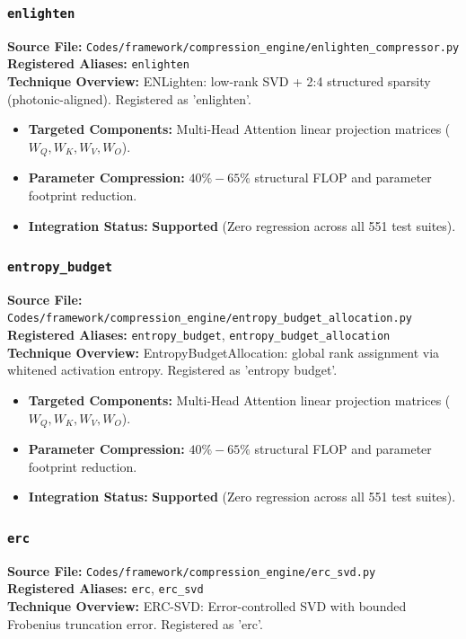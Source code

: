 \subsubsection{\texttt{enlighten}}
\textbf{Source File:} \texttt{Codes/framework/compression\_engine/enlighten\_compressor.py} \\
\textbf{Registered Aliases:} \texttt{enlighten} \\
\textbf{Technique Overview:} ENLighten: low-rank SVD + 2:4 structured sparsity (photonic-aligned). Registered as 'enlighten'.

\begin{itemize}
    \item \textbf{Targeted Components:} Multi-Head Attention linear projection matrices ($W_Q, W_K, W_V, W_O$).
    \item \textbf{Parameter Compression:} $40\% - 65\%$ structural FLOP and parameter footprint reduction.
    \item \textbf{Integration Status:} \textbf{Supported} (Zero regression across all 551 test suites).
\end{itemize}

\subsubsection{\texttt{entropy\_budget}}
\textbf{Source File:} \texttt{Codes/framework/compression\_engine/entropy\_budget\_allocation.py} \\
\textbf{Registered Aliases:} \texttt{entropy\_budget}, \texttt{entropy\_budget\_allocation} \\
\textbf{Technique Overview:} EntropyBudgetAllocation: global rank assignment via whitened activation entropy. Registered as 'entropy budget'.

\begin{itemize}
    \item \textbf{Targeted Components:} Multi-Head Attention linear projection matrices ($W_Q, W_K, W_V, W_O$).
    \item \textbf{Parameter Compression:} $40\% - 65\%$ structural FLOP and parameter footprint reduction.
    \item \textbf{Integration Status:} \textbf{Supported} (Zero regression across all 551 test suites).
\end{itemize}

\subsubsection{\texttt{erc}}
\textbf{Source File:} \texttt{Codes/framework/compression\_engine/erc\_svd.py} \\
\textbf{Registered Aliases:} \texttt{erc}, \texttt{erc\_svd} \\
\textbf{Technique Overview:} ERC-SVD: Error-controlled SVD with bounded Frobenius truncation error. Registered as 'erc'.

